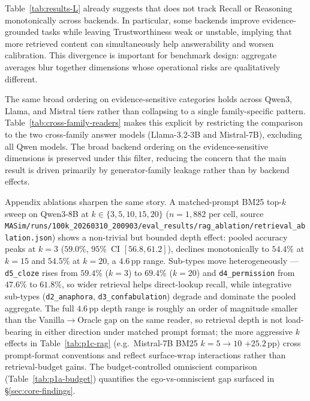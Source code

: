 Table~\ref{tab:results-L} already suggests that \DFiveDef does not track Recall or Reasoning monotonically across backends.
In particular, some backends improve evidence-grounded tasks while leaving Trustworthiness weak or unstable, implying that more retrieved content can simultaneously help answerability and worsen calibration.
This divergence is important for benchmark design: aggregate averages blur together dimensions whose operational risks are qualitatively different.

The same broad ordering on evidence-sensitive categories holds across Qwen3, Llama, and Mistral tiers rather than collapsing to a single family-specific pattern.
Table~\ref{tab:cross-family-readers} makes this explicit by restricting the comparison to the two cross-family answer models (Llama-3.2-3B and Mistral-7B), excluding all Qwen models.
The broad backend ordering on the evidence-sensitive dimensions is preserved under this filter, reducing the concern that the main result is driven primarily by generator-family leakage rather than by backend effects.



Appendix ablations sharpen the same story.
A matched-prompt BM25 top-$k$ sweep on Qwen3-8B at $k \in \{3, 5, 10, 15, 20\}$ ($n{=}1{,}882$ per cell, source \texttt{MASim/runs/100k\_20260310\_200903/eval\_results/rag\_ablation/retrieval\_ablation.json}) shows a non-trivial but bounded depth effect: pooled accuracy peaks at $k{=}3$ ($59.0\%$, $95\%$~CI $[56.8, 61.2]$), declines monotonically to $54.4\%$ at $k{=}15$ and $54.5\%$ at $k{=}20$, a $4.6$\,pp range. Sub-types move heterogeneously --- \texttt{d5\_cloze} rises from $59.4\%$ ($k{=}3$) to $69.4\%$ ($k{=}20$) and \texttt{d4\_permission} from $47.6\%$ to $61.8\%$, so wider retrieval helps direct-lookup recall, while integrative sub-types (\texttt{d2\_anaphora}, \texttt{d3\_confabulation}) degrade and dominate the pooled aggregate. The full $4.6$\,pp depth range is roughly an order of magnitude smaller than the Vanilla$\to$Oracle gap on the same reader, so retrieval depth is not load-bearing in either direction under matched prompt format; the more aggressive $k$ effects in Table~\ref{tab:p1c-rag} (e.g.\ Mistral-7B BM25 $k{=}5{\to}10$ $+25.2$\,pp) cross prompt-format conventions and reflect surface-wrap interactions rather than retrieval-budget gains.
The budget-controlled omniscient comparison (Table~\ref{tab:p1a-budget}) quantifies the ego-vs-omniscient gap surfaced in \S\ref{sec:core-findings}.

